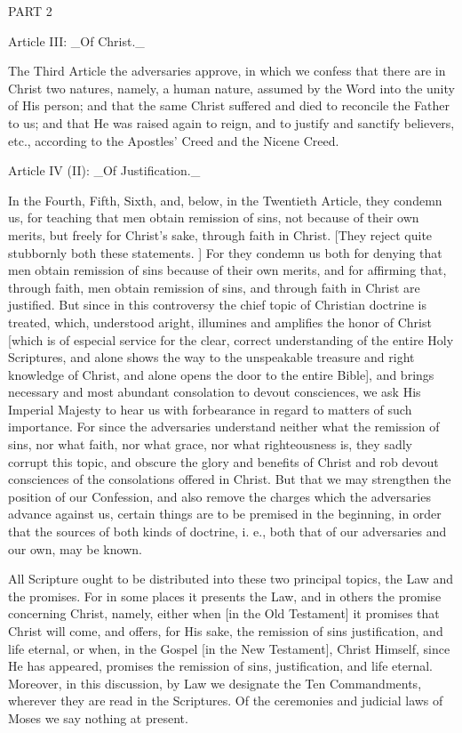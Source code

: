 PART 2


Article III: _Of Christ._

The Third Article the adversaries approve, in which we confess that
there are in Christ two natures, namely, a human nature, assumed by
the Word into the unity of His person; and that the same Christ
suffered and died to reconcile the Father to us; and that He was
raised again to reign, and to justify and sanctify believers, etc.,
according to the Apostles' Creed and the Nicene Creed.


Article IV (II): _Of Justification._

In the Fourth, Fifth, Sixth, and, below, in the Twentieth Article,
they condemn us, for teaching that men obtain remission of sins, not
because of their own merits, but freely for Christ's sake, through
faith in Christ.  [They reject quite stubbornly both these statements.
] For they condemn us both for denying that men obtain remission of
sins because of their own merits, and for affirming that, through
faith, men obtain remission of sins, and through faith in Christ are
justified.  But since in this controversy the chief topic of
Christian doctrine is treated, which, understood aright, illumines
and amplifies the honor of Christ [which is of especial service for
the clear, correct understanding of the entire Holy Scriptures, and
alone shows the way to the unspeakable treasure and right knowledge
of Christ, and alone opens the door to the entire Bible], and brings
necessary and most abundant consolation to devout consciences, we ask
His Imperial Majesty to hear us with forbearance in regard to matters
of such importance.  For since the adversaries understand neither
what the remission of sins, nor what faith, nor what grace, nor what
righteousness is, they sadly corrupt this topic, and obscure the
glory and benefits of Christ and rob devout consciences of the
consolations offered in Christ.  But that we may strengthen the
position of our Confession, and also remove the charges which the
adversaries advance against us, certain things are to be premised in
the beginning, in order that the sources of both kinds of doctrine, i.
e., both that of our adversaries and our own, may be known.

All Scripture ought to be distributed into these two principal topics,
the Law and the promises.  For in some places it presents the Law,
and in others the promise concerning Christ, namely, either when [in
the Old Testament] it promises that Christ will come, and offers, for
His sake, the remission of sins justification, and life eternal, or
when, in the Gospel [in the New Testament], Christ Himself, since He
has appeared, promises the remission of sins, justification, and life
eternal.  Moreover, in this discussion, by Law we designate the Ten
Commandments, wherever they are read in the Scriptures.  Of the
ceremonies and judicial laws of Moses we say nothing at present.

